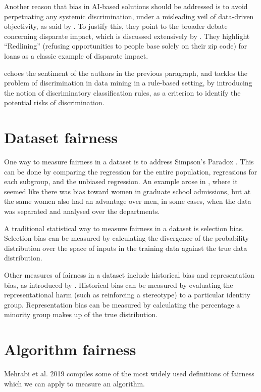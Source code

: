 \documentclass[conference]{IEEEtran}
\begin{document}
Another reason that bias in AI-based solutions should be addressed is to avoid perpetuating any systemic discrimination, under a misleading veil of data-driven objectivity, as said by \cite{d_Alessandro_2017}. To justify this, they point to the broader debate concerning disparate impact, which is discussed extensively by \cite{10.2307/24758720}. They highlight “Redlining” (refusing opportunities to people base solely on their zip code) for loans as a classic example of disparate impact.

\cite{10.1145/1401890.1401959} echoes the sentiment of the authors in the previous paragraph, and tackles the problem of discrimination in data mining in a rule-based setting, by introducing the notion of discriminatory classification rules, as a criterion to identify the potential risks of discrimination.

\section{Dataset fairness}
One way to measure fairness in a dataset is to address Simpson's Paradox \cite{10.2307/2284382}. This can be done by comparing the regression for the entire population, regressions for each subgroup, and the unbiased regression. An example arose in \cite{Bickel398}, where it seemed like there was bias toward women in graduate school admissions, but at the same women also had an advantage over men, in some cases, when the data was separated and analysed over the departments.

A traditional statistical way to measure fairness in a dataset is selection bias. Selection bias can be measured by calculating the divergence of the probability distribution over the space of inputs in the training data against the true data distribution.

Other measures of fairness in a dataset include historical bias and representation bias, as introduced by \cite{DBLP:journals/corr/abs-1901-10002}. Historical bias can be measured by evaluating the representational harm (such as reinforcing a stereotype) to a particular identity group. Representation bias can be measured by calculating the percentage a minority group makes up of the true distribution. 

\section{Algorithm fairness}
Mehrabi et al. 2019 \cite{DBLP:journals/corr/abs-1908-09635} compiles some of the most widely used definitions of fairness which we can apply to measure an algorithm.
\end{document}
